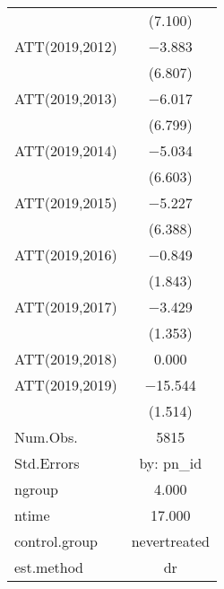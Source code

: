 \begin{table}
\begin{tabular}[t]{lc}
 & (\num{7.100})\\
ATT(2019,2012) & \num{-3.883}\\
 & (\num{6.807})\\
ATT(2019,2013) & \num{-6.017}\\
 & (\num{6.799})\\
ATT(2019,2014) & \num{-5.034}\\
 & (\num{6.603})\\
ATT(2019,2015) & \num{-5.227}\\
 & (\num{6.388})\\
ATT(2019,2016) & \num{-0.849}\\
 & (\num{1.843})\\
ATT(2019,2017) & \num{-3.429}\\
 & (\num{1.353})\\
ATT(2019,2018) & \num{0.000}\\
ATT(2019,2019) & \num{-15.544}\\
 & (\num{1.514})\\
\midrule
Num.Obs. & \num{5815}\\
Std.Errors & by: pn\_id\\
ngroup & \num{4.000}\\
ntime & \num{17.000}\\
control.group & nevertreated\\
est.method & dr\\
\bottomrule
\end{tabular}
\end{table}
